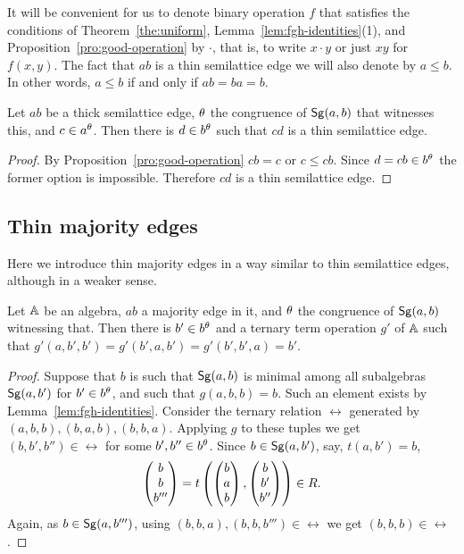 \documentclass[11pt]{article}
\begin{document}
It will be convenient for us to denote binary operation $f$ that satisfies the 
conditions of Theorem~\ref{the:uniform}, Lemma~\ref{lem:fgh-identities}(1),
and Proposition~\ref{pro:good-operation} by $\cdot$, that is, to write $x\cdot y$
or just $xy$ for $f(x,y)$. The fact that $ab$ is a thin semilattice edge we will
also denote by $a\le b$. In other words, $a\le b$ if and only if $ab=ba=b$.

\begin{lemma}\label{lem:sl-thick-thin}
Let $ab$ be a thick semilattice edge, $\theta$ the congruence of ${\sf Sg}(a,b)$ that witnesses 
this, and $c\in a^\theta$. Then there is $d\in b^\theta$ such that $cd$ is a thin semilattice 
edge.
\end{lemma}

\begin{proof}
By Proposition~\ref{pro:good-operation} $cb=c$ or $c\le cb$. Since $d=cb\in b^\theta$ 
the former option is impossible. Therefore $cd$ is a thin semilattice edge.
\end{proof}


\subsection{Thin majority edges}\label{sec:thin-majority}

Here we introduce thin majority edges in a way similar to thin semilattice edges,
although in a weaker sense.

\begin{lemma}\label{lem:thin-majority}
Let ${\mathbb A}$ be an algebra, $ab$ a majority edge in it, and $\theta$ the congruence of 
${\sf Sg}(a,b)$ witnessing that. Then there is $b'\in b^\theta$ and a ternary term operation 
$g'$ of ${\mathbb A}$ such that $g'(a,b',b')=g'(b',a,b')=g'(b',b',a)=b'$.
\end{lemma}

\begin{proof}
Suppose that $b$ is such that ${\sf Sg}(a,b)$ is minimal among all subalgebras ${\sf Sg}(a,b')$ 
for $b'\in b^\theta$, and such that $g(a,b,b)=b$. Such an element exists by 
Lemma~\ref{lem:fgh-identities}. Consider the ternary relation $\rel$ 
generated by $(a,b,b),(b,a,b),(b,b,a)$. Applying $g$ to these tuples we get 
$(b,b',b'')\in\rel$ for some $b',b''\in b^\theta$. Since $b\in{\sf Sg}(a,b')$, say, $t(a,b')=b$, 
$$
\cll bb{b'''}=t\left(\cll bab,\cll b{b'}{b''}\right)\in\rel.
$$
Again, as $b\in{\sf Sg}(a,b''')$, using $(b,b,a),(b,b,b''')\in\rel$ we get $(b,b,b)\in\rel$.
\end{proof}
\end{document}
